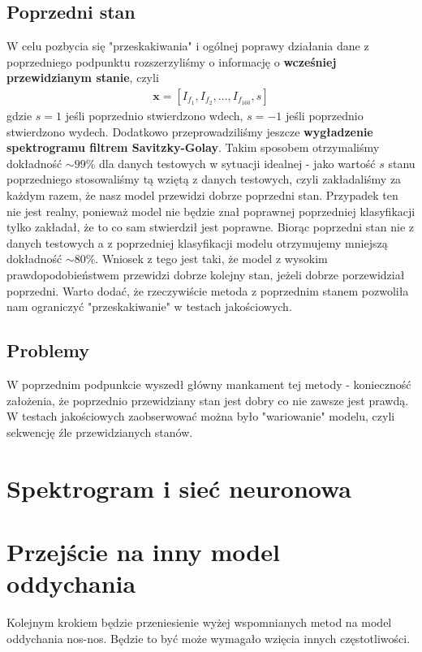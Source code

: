 \documentclass[polish]{article}
\begin{document}
\subsection{Poprzedni stan}
W celu pozbycia się "przeskakiwania" i ogólnej poprawy działania dane z poprzedniego podpunktu rozszerzyliśmy o informację o \textbf{wcześniej przewidzianym stanie}, czyli 
\begin{gather*}
	\boldsymbol{x} = [I_{f_1}, I_{f_2}, ..., I_{f_{160}},  s]
\end{gather*}
 gdzie $s = 1$ jeśli poprzednio stwierdzono wdech, $s=-1$ jeśli poprzednio stwierdzono wydech.
Dodatkowo przeprowadziliśmy jeszcze \textbf{wygładzenie spektrogramu filtrem Savitzky-Golay}.
Takim sposobem otrzymaliśmy dokładność $\sim 99\%$ dla danych testowych w sytuacji idealnej - jako wartość $s$ stanu poprzedniego stosowaliśmy tą wziętą z
danych testowych, czyli zakładaliśmy za każdym razem, że nasz model przewidzi dobrze poprzedni stan.
Przypadek ten nie jest realny, ponieważ model nie będzie znał poprawnej poprzedniej klasyfikacji tylko 
zakładał, że to co sam stwierdził jest poprawne.  Biorąc poprzedni stan nie z danych testowych a z poprzedniej
klasyfikacji modelu otrzymujemy mniejszą dokładność $\sim 80\%$. Wniosek z tego jest taki, że model
z wysokim prawdopodobieństwem przewidzi dobrze kolejny stan, jeżeli dobrze porzewidział poprzedni. 
Warto dodać, że rzeczywiście metoda z poprzednim stanem pozwoliła nam ograniczyć "przeskakiwanie" 
w testach jakościowych.
\subsection{Problemy}
W poprzednim podpunkcie wyszedł główny mankament tej metody - konieczność założenia, że poprzednio
przewidziany stan jest dobry co nie zawsze jest prawdą. W testach jakościowych zaobserwować można było
"wariowanie" modelu, czyli sekwencję źle przewidzianych stanów.

\section{Spektrogram i sieć neuronowa}

\section{Przejście na inny model oddychania}
Kolejnym krokiem będzie przeniesienie wyżej wspomnianych metod na model oddychania nos-nos. 
Będzie to być może wymagało wzięcia innych częstotliwości.
\end{document}
